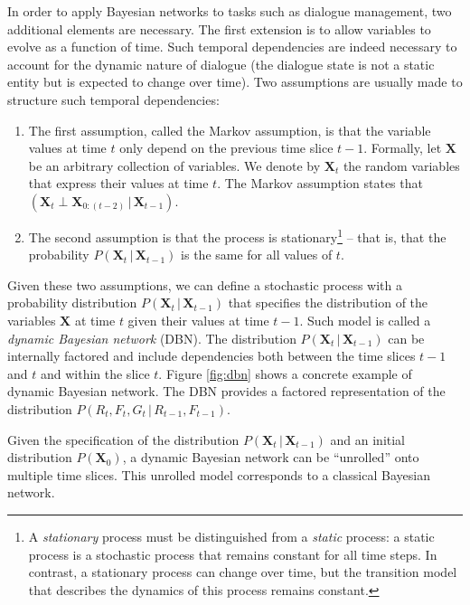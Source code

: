 In order to apply Bayesian networks to tasks such as dialogue management, two additional elements are necessary. The first extension is to allow variables to evolve as a function of time.  Such temporal dependencies are indeed necessary to account for the dynamic nature of dialogue (the dialogue state is not a static entity but is expected to change over time). Two assumptions are usually made to structure such temporal dependencies: \begin{enumerate}
\item The first assumption, called the Markov assumption, is that the variable values at time $t$ only depend on the previous time slice $t\!-\!1$.  Formally, let $\mathbf{X}$ be an arbitrary collection of variables. We denote by $\mathbf{X}_t$ the random variables that express their values at time $t$.  The Markov assumption states that $(\mathbf{X}_t \; \bot \; \mathbf{X}_{0:(t-2)}  \, | \,  \mathbf{X}_{t\!-\!1})$.  

\item The second assumption is that the process is stationary\footnote{A \textit{stationary} process must be distinguished from a \textit{static} process: a static process is a stochastic process that remains constant for all time steps. In contrast, a stationary process can change over time, but the transition model that describes the dynamics of this process remains constant.} -- that is, that the probability $P(\mathbf{X}_t  \, | \,  \mathbf{X}_{t\!-\!1})$ is the same for all values of $t$.
\end{enumerate}

Given these two assumptions, we can define a stochastic process with a probability distribution $P(\mathbf{X}_t  \, | \,  \mathbf{X}_{t\!-\!1})$ that specifies the distribution of the variables $\mathbf{X}$ at time $t$ given their values at time $t\!-\!1$. Such model is called a \textit{dynamic Bayesian network} (DBN). The distribution $P(\mathbf{X}_t  \, | \,  \mathbf{X}_{t\!-\!1})$ can be internally factored and include dependencies both between the time slices $t\!-\!1$ and $t$ and within the slice $t$.  Figure \ref{fig:dbn} shows a concrete example of dynamic Bayesian network. The DBN provides a factored representation of the distribution  $P(R_t, F_t, G_t \, | \, R_{t\!-\!1}, F_{t\!-\!1})$.  

Given the specification of the distribution $P(\mathbf{X}_t  \, | \,  \mathbf{X}_{t\!-\!1})$ and an initial distribution $P(\mathbf{X}_0)$, a dynamic Bayesian network can be ``unrolled'' onto multiple time slices.  This unrolled model corresponds to a classical Bayesian network.  

